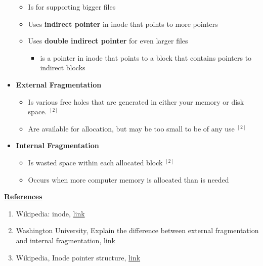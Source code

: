 \documentclass[12pt]{article}
\begin{document}
\begin{itemize}
    \begin{itemize}
        \item Is for supporting bigger files
        \item Uses \textbf{indirect pointer} in inode that points to more pointers
        \item Uses \textbf{double indirect pointer} for even larger files

        \begin{itemize}
            \item is a pointer in inode that points to a block that contains
            pointers to indirect blocks
        \end{itemize}
    \end{itemize}

    \item \textbf{External Fragmentation}

    \begin{itemize}
        \item Is various free holes that are generated in either your
        memory or disk space. $^{[2]}$
        \item Are available for allocation, but may be too small to be of
        any use $^{[2]}$
    \end{itemize}

    \item \textbf{Internal Fragmentation}

    \begin{itemize}
        \item Is wasted space within each allocated block $^{[2]}$
        \item Occurs when more computer memory is allocated than is needed
    \end{itemize}
\end{itemize}

\bigskip

\underline{\textbf{References}}

\begin{enumerate}[1)]
    \item Wikipedia: inode, \href{https://en.wikipedia.org/wiki/Inode}{link}
    \item Washington University, Explain the difference between external fragmentation
    and internal fragmentation, \href{https://courses.cs.washington.edu/courses/cse451/00sp/misc/quiz2sol.txt}{link}
    \item Wikipedia, Inode pointer structure, \href{https://en.wikipedia.org/wiki/Inode_pointer_structure}{link}
\end{enumerate}
\end{document}
